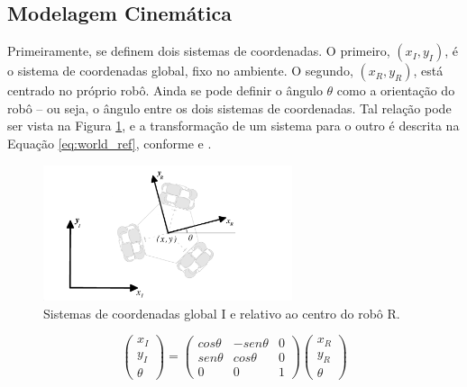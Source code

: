 \subsection{Modelagem Cinemática}

Primeiramente, se definem dois sistemas de coordenadas. O primeiro, $(x_I,y_I)$, é o sistema de coordenadas global, fixo no ambiente. O segundo, $(x_R,y_R)$, está centrado no próprio robô. Ainda se pode definir o ângulo $\theta$ como a orientação do robô -- ou seja, o ângulo entre os dois sistemas de coordenadas. Tal relação pode ser vista na Figura \ref{fig:ref}, e a transformação de um sistema para o outro é descrita na Equação \ref{eq:world_ref}, conforme \cite{siegwart2011introduction} e \cite{ritter2016modelagem}.

\begin{figure}[h]
  \centering
  \includegraphics[width = 0.65\textwidth]{imagens/ref}
  \caption{Sistemas de coordenadas global I e relativo ao centro do robô R.}
  \label{fig:ref}
\end{figure}

\begin{equation}
  \begin{pmatrix}
    x_I \\
    y_I \\
    \theta
  \end{pmatrix}
  =
  \begin{pmatrix}
    cos \theta & -sen \theta & 0 \\
    sen\theta  &  cos \theta & 0 \\
    0          & 0          & 1
  \end{pmatrix}
  \begin{pmatrix}
    x_R \\
    y_R \\
    \theta
  \end{pmatrix}
  \label{eq:world_ref}
\end{equation}

